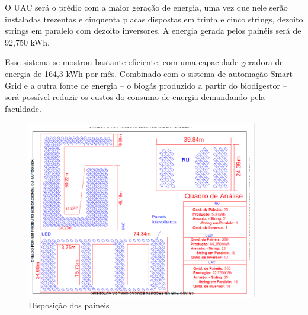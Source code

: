\par O UAC será o prédio com a maior geração de energia, uma vez que nele serão instaladas trezentas e cinquenta placas dispostas em trinta e cinco strings, dezoito strings em paralelo com dezoito inversores. A energia gerada pelos painéis será de 92,750 kWh.

\par Esse sistema se mostrou bastante eficiente, com uma capacidade geradora de energia de 164,3 kWh por mês. Combinado com o sistema de automação Smart Grid e a outra fonte de energia -- o biogás produzido a partir do biodigestor -- será possível reduzir os custos do consumo de energia demandando pela faculdade.

\begin{figure}[h]
\centering
\includegraphics[width=0.9\textwidth]{figuras/disposicao.PNG}
\caption{Disposição dos paineis}
\end{figure}